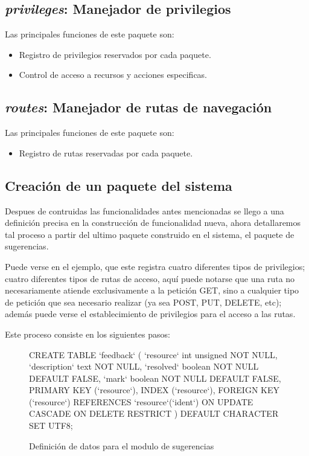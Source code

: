 \subsection{\emph{privileges}: Manejador de privilegios}
Las principales funciones de este paquete son:

\begin{itemize}
\item Registro de privilegios reservados por cada paquete.
\item Control de acceso a recursos y acciones especificas.
\end{itemize}

\subsection{\emph{routes}: Manejador de rutas de navegación}
Las principales funciones de este paquete son:

\begin{itemize}
\item Registro de rutas reservadas por cada paquete.
\end{itemize}

\subsection{Creación de un paquete del sistema}
Despues de contruidas las funcionalidades antes mencionadas se llego a una
definición precisa en la construcción de funcionalidad nueva, ahora detallaremos
tal proceso a partir del ultimo paquete construido en el sistema, el paquete de
sugerencias.

Puede verse en el ejemplo, que este registra cuatro diferentes tipos de
privilegios; cuatro diferentes tipos de rutas de acceso, aquí puede notarse que
una ruta no necesariamente atiende exclusivamente a la petición GET, sino a
cualquier tipo de petición que sea necesario realizar (ya sea POST, PUT, DELETE,
etc); además puede verse el establecimiento de privilegios para el acceso a las
rutas.

Este proceso consiste en los siguientes pasos:

\begin{figure}
\centering
\begin{SQL}
CREATE TABLE `feedback` (
    `resource`    int unsigned NOT NULL,
    `description` text         NOT NULL,
    `resolved`    boolean      NOT NULL DEFAULT FALSE,
    `mark`        boolean      NOT NULL DEFAULT FALSE,
    PRIMARY KEY (`resource`),
    INDEX (`resource`),
    FOREIGN KEY (`resource`) REFERENCES `resource`(`ident`)
        ON UPDATE CASCADE ON DELETE RESTRICT
) DEFAULT CHARACTER SET UTF8;
\end{SQL}
\caption{Definición de datos para el modulo de sugerencias}
\label{code1}
\end{figure}


